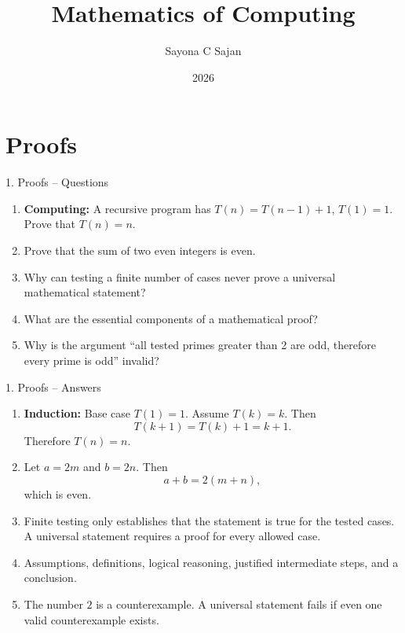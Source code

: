 \documentclass[aspectratio=169,11pt]{beamer}
\title[Mathematics of Computing]
{Mathematics of Computing}
\author{Sayona C Sajan}
\institute{
CUSAT -- M.Tech Artificial Intelligence \& Software Engineering
}
\date{2026}
\begin{document}

{
\begin{frame}
    \titlepage
\end{frame}
}



\section{Proofs}

\begin{frame}{1. Proofs -- Questions}

\begin{enumerate}
\item \textbf{Computing:} A recursive program has
$T(n)=T(n-1)+1$, $T(1)=1$. Prove that $T(n)=n$.

\item Prove that the sum of two even integers is even.

\item Why can testing a finite number of cases never prove a universal mathematical statement?

\item What are the essential components of a mathematical proof?

\item Why is the argument ``all tested primes greater than 2 are odd, therefore every prime is odd'' invalid?
\end{enumerate}

\end{frame}

\begin{frame}{1. Proofs -- Answers}

\begin{enumerate}
\item \textbf{Induction:} Base case $T(1)=1$. Assume $T(k)=k$. Then
\[
T(k+1)=T(k)+1=k+1.
\]
Therefore $T(n)=n$.

\item Let $a=2m$ and $b=2n$. Then
\[
a+b=2(m+n),
\]
which is even.

\item Finite testing only establishes that the statement is true for the tested cases. A universal statement requires a proof for every allowed case.

\item Assumptions, definitions, logical reasoning, justified intermediate steps, and a conclusion.

\item The number $2$ is a counterexample. A universal statement fails if even one valid counterexample exists.
\end{enumerate}

\end{frame}
\end{document}
